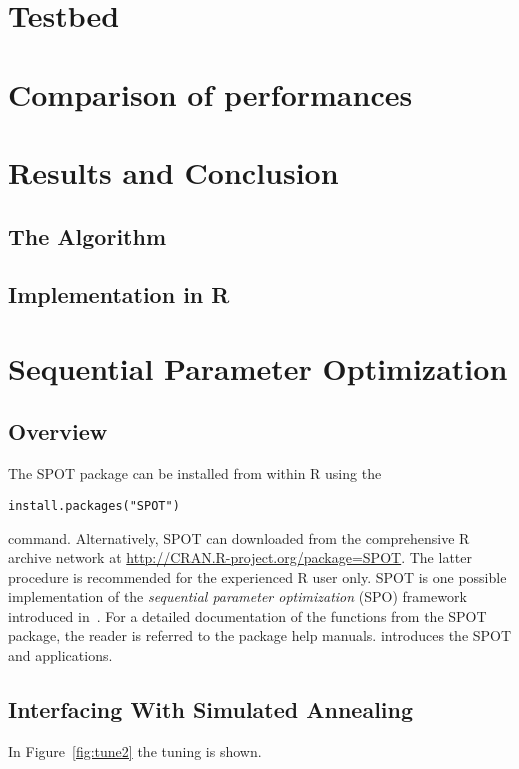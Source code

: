 \documentclass[runningheads]{llncs}
\begin{document}
\section{Testbed }\label{sec:test}
\section{Comparison of performances  }\label{sec:test}
\section{Results and Conclusion }\label{sec:test}
\subsection{The Algorithm}

\subsection{Implementation in R}

\section{Sequential Parameter Optimization}
\subsection{Overview}
 The SPOT package can be installed from within R using the 
\begin{verbatim}
install.packages("SPOT")
\end{verbatim}
command. Alternatively, SPOT can 
downloaded from the
comprehensive R  archive network at \url{http://CRAN.R-project.org/package=SPOT}.
The latter procedure is recommended for the experienced R user only. 
SPOT is one possible implementation of the \emph{sequential parameter optimization}\/
(SPO) framework introduced in~\cite{Bart06a}.
For a detailed documentation of the functions from the SPOT package, the
reader is referred to the package help manuals.
\cite{Bart12i} introduces the SPOT and applications.
\subsection{Interfacing With Simulated Annealing}
In Figure~\ref{fig:tune2} the tuning is shown.


\end{document}
